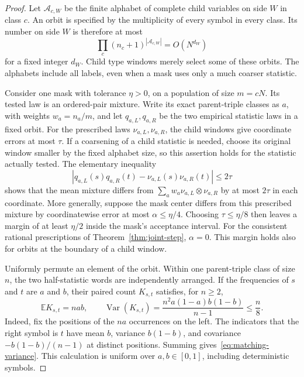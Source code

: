 \begin{proof}
Let $\mathcal A_{c,W}$ be the finite alphabet of complete child variables
on side $W$ in class $c$.  An orbit is specified by the multiplicity of
every symbol in every class.  Its number on side $W$ is therefore at
most
\[
 \prod_c(n_c+1)^{|\mathcal A_{c,W}|}=O(N^{d_W})
\]
for a fixed integer $d_W$.  Child type windows merely select some of
these orbits.  The alphabets include all labels, even when a mask uses
only a much coarser statistic.

Consider one mask with tolerance $\eta>0$, on a population of size
$m=cN$.  Its tested law is an ordered-pair mixture.  Write its exact
parent-triple classes as $a$, with weights $w_a=n_a/m$, and let
$q_{a,L},q_{a,R}$ be the two empirical statistic laws in a fixed orbit.
For the prescribed laws $\nu_{a,L},\nu_{a,R}$, the child windows give
coordinate errors at most $\tau$.  If a coarsening of a child statistic
is needed, choose its original window smaller by the fixed alphabet
size, so this assertion holds for the statistic actually tested.
The elementary inequality
\[
 |q_{a,L}(s)q_{a,R}(t)
       -\nu_{a,L}(s)\nu_{a,R}(t)|\leq 2\tau
\]
shows that the mean mixture differs from
$\sum_a w_a\nu_{a,L}\otimes\nu_{a,R}$ by at most $2\tau$
in each coordinate.  More generally, suppose the mask center differs
from this prescribed mixture by coordinatewise error at most
$\alpha\leq\eta/4$.  Choosing $\tau\leq\eta/8$ then leaves a margin
of at least $\eta/2$ inside the mask's acceptance interval.  For the
consistent rational prescriptions of Theorem~\ref{thm:joint-step},
$\alpha=0$.  This margin holds also for orbits at the boundary of a child window.

Uniformly permute an element of the orbit.  Within one parent-triple
class of size $n$, the two half-statistic words are independently
arranged.  If the frequencies of $s$ and $t$ are $a$ and $b$, their
paired count $K_{s,t}$ satisfies, for $n\geq2$,
\begin{equation}
 \mathbb E K_{s,t}=nab,\qquad
 \operatorname{Var}(K_{s,t})
 =\frac{n^2a(1-a)b(1-b)}{n-1}\leq\frac n8.
 \label{eq:matching-variance}
\end{equation}
Indeed, fix the positions of the $na$ occurrences on the left.
The indicators that the right symbol is $t$ have mean $b$,
variance $b(1-b)$, and covariance $-b(1-b)/(n-1)$ at distinct
positions.  Summing gives~\eqref{eq:matching-variance}.  This calculation
is uniform over $a,b\in[0,1]$, including deterministic symbols.


\end{proof}
